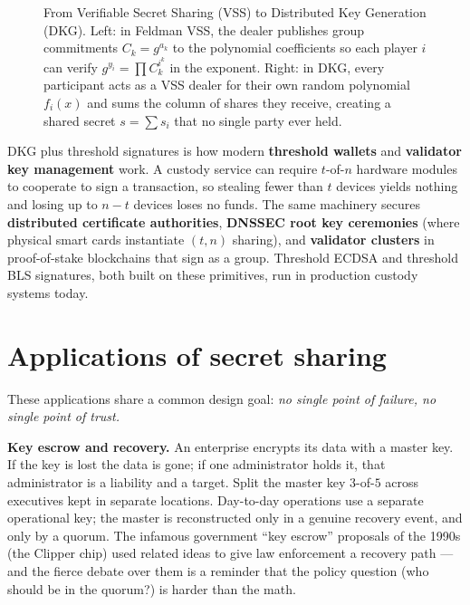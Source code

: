 \begin{figure}[H]
\caption{From Verifiable Secret Sharing (VSS) to Distributed Key Generation (DKG). Left: in Feldman VSS, the dealer publishes group commitments $C_k = g^{a_k}$ to the polynomial coefficients so each player $i$ can verify $g^{y_i} = \prod C_k^{i^k}$ in the exponent. Right: in DKG, every participant acts as a VSS dealer for their own random polynomial $f_i(x)$ and sums the column of shares they receive, creating a shared secret $s = \sum s_i$ that no single party ever held.}
\label{ch32:fig-vss-dkg}
\end{figure}

\begin{applicationbox}
DKG plus threshold signatures is how modern \textbf{threshold wallets} and \textbf{validator key management} work. A custody service can require $t$-of-$n$ hardware modules to cooperate to sign a transaction, so stealing fewer than $t$ devices yields nothing and losing up to $n-t$ devices loses no funds. The same machinery secures \textbf{distributed certificate authorities}, \textbf{DNSSEC root key ceremonies} (where physical smart cards instantiate $(t,n)$ sharing), and \textbf{validator clusters} in proof-of-stake blockchains that sign as a group. Threshold ECDSA and threshold BLS signatures, both built on these primitives, run in production custody systems today.
\end{applicationbox}

\section{Applications of secret sharing}
\label{ch32:applications}

These applications share a common design goal: \emph{no single point of failure, no single point of trust.}

\textbf{Key escrow and recovery.} An enterprise encrypts its data with a master key. If the key is lost the data is gone; if one administrator holds it, that administrator is a liability and a target. Split the master key $3$-of-$5$ across executives kept in separate locations. Day-to-day operations use a separate operational key; the master is reconstructed only in a genuine recovery event, and only by a quorum. The infamous government ``key escrow'' proposals of the 1990s (the Clipper chip) used related ideas to give law enforcement a recovery path --- and the fierce debate over them is a reminder that the policy question (who should be in the quorum?) is harder than the math.

